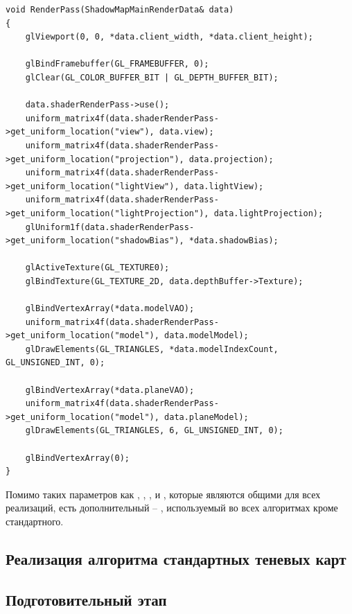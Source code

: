 \begin{center}
\captionsetup{justification=centering, singlelinecheck=off}
\begin{lstlisting}[label=lst:shadow_map_render, caption=Алгоритм заполнения теневой карты]
void RenderPass(ShadowMapMainRenderData& data)
{
    glViewport(0, 0, *data.client_width, *data.client_height);

    glBindFramebuffer(GL_FRAMEBUFFER, 0);
    glClear(GL_COLOR_BUFFER_BIT | GL_DEPTH_BUFFER_BIT);

    data.shaderRenderPass->use();
    uniform_matrix4f(data.shaderRenderPass->get_uniform_location("view"), data.view);
    uniform_matrix4f(data.shaderRenderPass->get_uniform_location("projection"), data.projection);
    uniform_matrix4f(data.shaderRenderPass->get_uniform_location("lightView"), data.lightView);
    uniform_matrix4f(data.shaderRenderPass->get_uniform_location("lightProjection"), data.lightProjection);
    glUniform1f(data.shaderRenderPass->get_uniform_location("shadowBias"), *data.shadowBias);

    glActiveTexture(GL_TEXTURE0);
    glBindTexture(GL_TEXTURE_2D, data.depthBuffer->Texture);

    glBindVertexArray(*data.modelVAO);
    uniform_matrix4f(data.shaderRenderPass->get_uniform_location("model"), data.modelModel);
    glDrawElements(GL_TRIANGLES, *data.modelIndexCount, GL_UNSIGNED_INT, 0);

    glBindVertexArray(*data.planeVAO);
    uniform_matrix4f(data.shaderRenderPass->get_uniform_location("model"), data.planeModel);
    glDrawElements(GL_TRIANGLES, 6, GL_UNSIGNED_INT, 0);

    glBindVertexArray(0);
}
\end{lstlisting}
\end{center}

Помимо таких параметров как ,
, ,  и
, которые являются общими для всех реализаций,
есть дополнительный -- , используемый во всех
алгоритмах кроме стандартного.

\subsection{Реализация алгоритма стандартных теневых карт}

\subsection*{Подготовительный этап}

